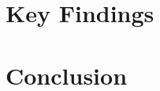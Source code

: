 \documentclass[manuscript]{acmart}
\begin{document}





\section{Key Findings}

\section{Conclusion}
\end{document}
